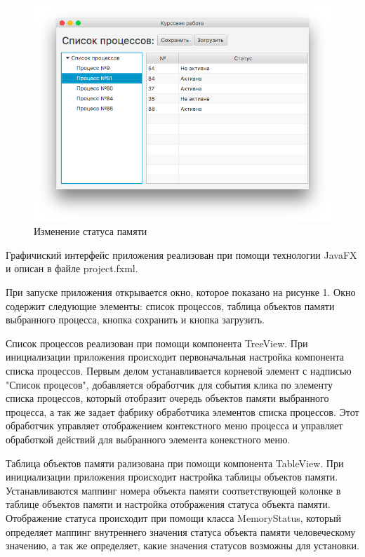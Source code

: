 \documentclass[russian,utf8,simple,hpadding=10mm,vpadding=20mm]{eskdtext}
\begin{document}
\begin{figure}[!h]
    \centering
    \includegraphics[width=1\textwidth]{screenshots/5.png}
    \caption{Изменение статуса памяти}
    \label{fig:mesh5}
\end{figure}

Графичиский интерфейс приложения реализован при помощи технологии JavaFX и описан в файле project.fxml.
 
При запуске приложения открывается окно, которое показано на рисунке 1. Окно содержит следующие элементы: список процессов, таблица объектов памяти выбранного процесса, кнопка сохранить и кнопка загрузить. 

Список процессов реализован при помощи компонента TreeView. При инициализации приложения происходит первоначальная настройка компонента списка процессов. Первым делом устанавливается корневой элемент с надписью "Список процесов", добавляется обработчик для события клика по элементу списка процессов, который отобразит очередь объектов памяти выбранного процесса, а так же задает фабрику обработчика элементов списка процессов. Этот обработчик управляет отображением контекстного меню процесса и управляет обработкой действий для выбранного элемента конекстного меню.

Таблица объектов памяти рализована при помощи компонента TableView. При инициализации приложения происходит настройка таблицы объектов памяти. Устанавливаются маппинг номера объекта памяти соответствующей колонке в таблице объектов памяти и настройка отображения статуса объекта памяти. Отображение статуса происходит при помощи класса MemoryStatus, который определяет маппинг внутреннего значения статуса объекта памяти человеческому значению, а так же определяет, какие значения статусов возможны для установки.
\end{document}
